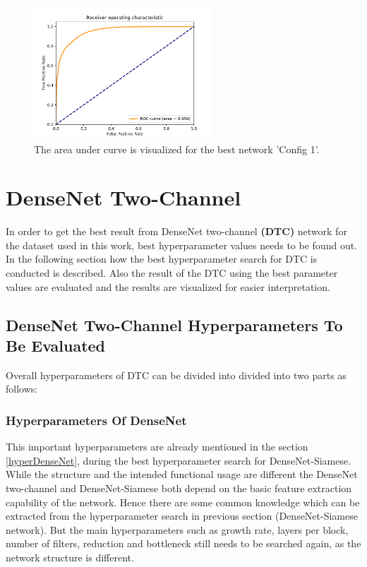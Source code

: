 \begin{figure}[ht]
\centering
\includegraphics[height= 5cm]{images/densenet/siamese/keras_densenet_siamese_4Nov_15400_9497}
\caption[Area under curve for best Config 1]{The area under curve is visualized for the best network 'Config 1'.}
\label{fig:auc_top_config}
\end{figure}



\section{DenseNet Two-Channel}
\label{section:densenet}

In order to get the best result from DenseNet two-channel \textbf{(DTC)} network for the dataset used in this work, best hyperparameter values needs to be found out. 
In the following section how the best hyperparameter search for DTC is conducted is described. Also the result of the DTC using the best parameter values are evaluated and the results are visualized for easier interpretation.

\subsection{DenseNet Two-Channel Hyperparameters To Be Evaluated}
Overall hyperparameters of DTC can be divided into divided into two parts as follows:
\subsubsection{Hyperparameters Of DenseNet}
This important hyperparameters are already mentioned in the section \ref{hyperDenseNet}, during the best hyperparameter search for DenseNet-Siamese. While the structure and the intended functional usage are different the DenseNet two-channel
and DenseNet-Siamese both depend on the basic feature extraction capability of the network. Hence there are some common knowledge which can be extracted from the hyperparameter search in previous section (DenseNet-Siamese network). But the main 
hyperparameters such as growth rate, layers per block, number of filters, reduction and bottleneck still needs to be searched again, as the network structure is different.

